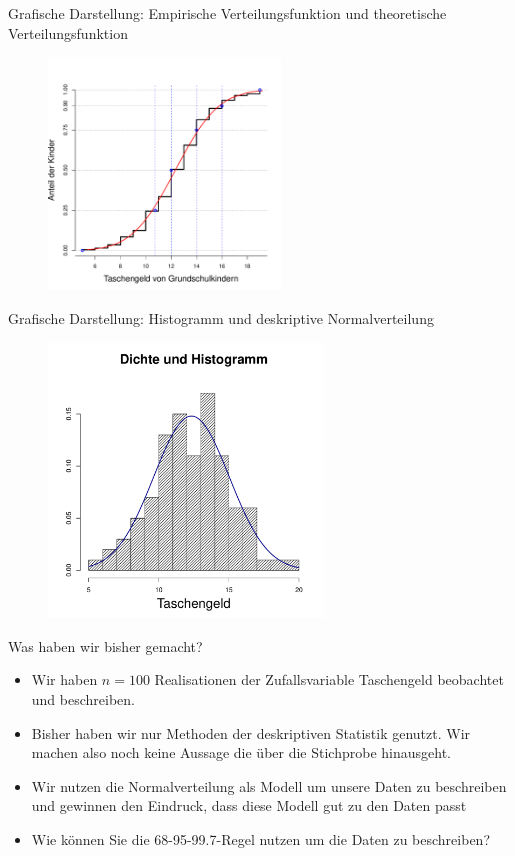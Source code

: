 \documentclass[usenames,dvipsnames,handout]{beamer}
\begin{document}
\begin{frame}{Grafische Darstellung: Empirische Verteilungsfunktion und theoretische Verteilungsfunktion}
        \begin{figure}[ht]
 	\centering
 	      \includegraphics[width=0.55\textwidth]{taschengeld_theo.pdf}
 	\end{figure}
\end{frame}

\begin{frame}{Grafische Darstellung: Histogramm und deskriptive Normalverteilung}
        \begin{figure}[ht]
 	\centering
 	      \includegraphics[width=0.65\textwidth]{taschengeld_dens.pdf}
 	\end{figure}
\end{frame}


\begin{frame}{Was haben wir bisher gemacht?}
\begin{itemize}
\item{Wir haben $n=100$ Realisationen der Zufallsvariable Taschengeld beobachtet
und beschreiben.}\pause
\item{Bisher haben wir nur Methoden der deskriptiven Statistik genutzt. Wir machen also
noch keine Aussage die über die Stichprobe hinausgeht.}\pause
\item{Wir nutzen die Normalverteilung als Modell um unsere Daten zu beschreiben
und gewinnen den Eindruck, dass diese Modell gut zu den Daten passt}\pause
\item{Wie können Sie die 68-95-99.7-Regel nutzen um die Daten zu beschreiben?}
\end{itemize}
\end{frame}
\end{document}
